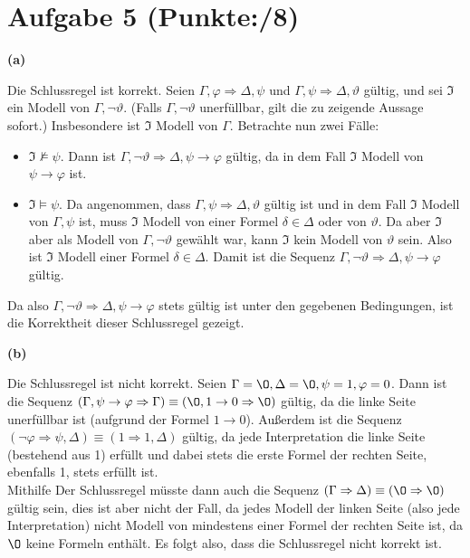 \documentclass[11pt, a4paper]{article}
\newcommand{\pppp}{8}
\begin{document}
\section*{Aufgabe 5 (Punkte:\qquad/\pppp)}
\textbf{(a)}
\begin{adjustwidth}{20pt}{20pt}
Die Schlussregel ist korrekt. Seien $\Gamma,\varphi \Rightarrow \Delta,\psi$ und $\Gamma,\psi \Rightarrow \Delta,\vartheta$ gültig, und sei $\mathfrak{I}$ ein Modell von
$\Gamma, \neg \vartheta$. (Falls $\Gamma, \neg \vartheta$ unerfüllbar, gilt die zu zeigende Aussage sofort.) Insbesondere ist $\mathfrak{I}$ Modell von $\Gamma$. Betrachte
nun zwei Fälle:
\begin{itemize}
\item $\mathfrak{I} \not\models \psi$. Dann ist $\Gamma, \neg \vartheta \Rightarrow \Delta, \psi \rightarrow \varphi$ gültig, da in dem Fall $\mathfrak{I}$ Modell von $\psi \rightarrow
	\varphi$ ist.
\item $\mathfrak{I} \models \psi$. Da angenommen, dass $\Gamma,\psi \Rightarrow \Delta,\vartheta$ gültig ist und in dem Fall $\mathfrak{I}$ Modell von $\Gamma,\psi$ ist, muss
	$\mathfrak{I}$ Modell von einer Formel $\delta \in \Delta$ oder von $\vartheta$. Da aber $\mathfrak{I}$ aber als Modell von $\Gamma, \neg \vartheta$ gewählt war,
	kann $\mathfrak{I}$ kein Modell von $\vartheta$ sein. Also ist $\mathfrak{I}$ Modell einer Formel $\delta \in \Delta$. Damit ist die Sequenz $\Gamma, \neg \vartheta
	\Rightarrow \Delta, \psi \rightarrow \varphi$ gültig.
\end{itemize}
Da also $\Gamma, \neg \vartheta \Rightarrow \Delta, \psi \rightarrow \varphi$ stets gültig ist unter den gegebenen Bedingungen, ist die Korrektheit dieser Schlussregel gezeigt.
\end{adjustwidth}
\textbf{(b)}
\begin{adjustwidth}{20pt}{20pt}
Die Schlussregel ist nicht korrekt. Seien $\Gamma=\O, \Delta=\O, \psi = 1, \varphi = 0$. Dann ist die Sequenz $(\Gamma,\psi \rightarrow \varphi \Rightarrow \Gamma)\equiv
(\O,1 \rightarrow 0 \Rightarrow \O)$ gültig, da die linke Seite unerfüllbar ist (aufgrund der Formel $1 \rightarrow 0$). Außerdem ist die Sequenz $(\neg \varphi \Rightarrow
\psi, \Delta)\equiv(1 \Rightarrow 1,\Delta)$ gültig, da jede Interpretation die linke Seite (bestehend aus 1) erfüllt und dabei stets die erste Formel der rechten Seite, ebenfalls 1,
stets erfüllt ist.\\
Mithilfe Der Schlussregel müsste dann auch die Sequenz $(\Gamma \Rightarrow \Delta)\equiv(\O \Rightarrow \O)$ gültig sein, dies ist aber nicht der Fall, da jedes Modell der linken
Seite (also jede Interpretation) nicht Modell von mindestens einer Formel der rechten Seite ist, da $\O$ keine Formeln enthält. Es folgt also, dass die Schlussregel nicht korrekt ist.
\end{adjustwidth}
\end{document}

